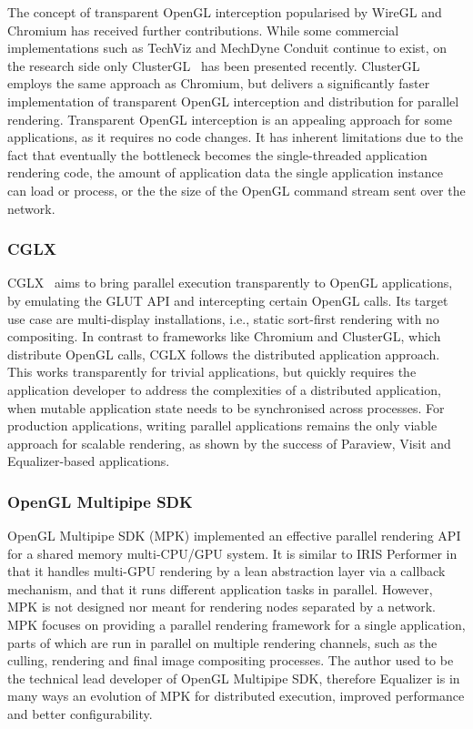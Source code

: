 The concept of transparent OpenGL interception popularised by WireGL and
Chromium has received further contributions. While some commercial
implementations such as {TechViz} and {MechDyne Conduit} continue to exist, on
the research side only {ClusterGL}~\cite{NHM:11} has been presented recently.
{ClusterGL} employs the same approach as {Chromium}, but delivers a
significantly faster implementation of transparent OpenGL interception and
distribution for parallel rendering. Transparent OpenGL interception is an
appealing approach for some applications, as it requires no code changes.
It has inherent limitations due to the fact that eventually the bottleneck
becomes the single-threaded application rendering code, the amount of
application data the single application instance can load or process, or the the
size of the OpenGL command stream sent over the network.

\subsubsection{CGLX}

{CGLX}~\cite{DK:11} aims to bring parallel execution transparently to OpenGL
applications, by emulating the GLUT API and intercepting certain OpenGL calls.
Its target use case are multi-display installations, i.e., static sort-first
rendering with no compositing. In contrast to frameworks like {Chromium} and
{ClusterGL}, which distribute OpenGL calls, {CGLX} follows the distributed
application approach. This works transparently for trivial applications, but
quickly requires the application developer to address the complexities of a
distributed application, when mutable application state needs to be
synchronised across processes. For production applications, writing parallel
applications remains the only viable approach for scalable rendering, as shown
by the success of {Paraview}, {Visit} and {Equalizer}-based applications.

\subsubsection{OpenGL Multipipe SDK}

OpenGL Multipipe SDK (MPK) \cite{BRE:05} implemented an effective parallel
rendering API for a shared memory multi-CPU/GPU system. It is similar to IRIS
Performer \cite{RH:94} in that it handles multi-GPU rendering by a lean
abstraction layer via a callback mechanism, and that it runs
different application tasks in parallel. However, MPK is not designed nor meant
for rendering nodes separated by a network. MPK focuses on providing a parallel
rendering framework for a single application, parts of which are run in
parallel on multiple rendering channels, such as the culling, rendering and
final image compositing processes. The author used to be the technical lead
developer of OpenGL Multipipe SDK, therefore Equalizer is in many ways an
evolution of MPK for distributed execution, improved performance and better
configurability.



